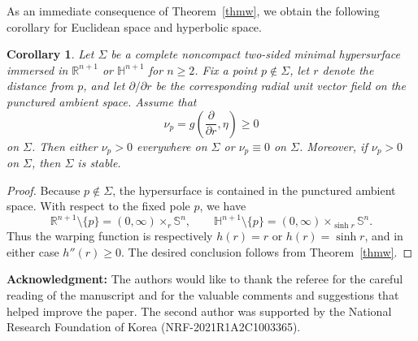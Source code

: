 \documentclass[amssymb,amstex,amsmath,11pt]{article}
\numberwithin{equation}{section}
\theoremstyle{plain}
\newtheorem{cor}[thm]{Corollary}
\theoremstyle{definition}
\theoremstyle{remark}
\begin{document}
As an immediate consequence of Theorem~\ref{thmw}, we obtain the following corollary for Euclidean space and hyperbolic space.








\begin{cor}\label{wceh}
Let $\Sigma$ be a complete noncompact two-sided minimal hypersurface immersed in $\mathbb{R}^{n+1}$ or $\mathbb{H}^{n+1}$ for $n\ge2$. Fix a point $p\notin\Sigma$, let $r$ denote the distance from $p$, and let $\partial/\partial r$ be the corresponding radial unit vector field on the punctured ambient space. Assume that
$$
\nu_p=g\!\left(\frac{\partial}{\partial r},\eta\right)\ge0
$$
on $\Sigma$. 
Then either $\nu_p>0$ everywhere on $\Sigma$ or $\nu_p\equiv0$ on $\Sigma$. 
Moreover, if $\nu_p>0$ on $\Sigma$, then $\Sigma$ is stable.
\end{cor}

\begin{proof}
Because $p\notin\Sigma$, the hypersurface is contained in the punctured ambient space. With respect to the fixed pole $p$, we have
$$
\mathbb{R}^{n+1}\setminus\{p\}=(0,\infty)\times_r\mathbb{S}^n,
\qquad
\mathbb{H}^{n+1}\setminus\{p\}=(0,\infty)\times_{\sinh r}\mathbb{S}^n.
$$
Thus the warping function is respectively $h(r)=r$ or $h(r)=\sinh r$, and in either case $h''(r)\ge0$. The desired conclusion  follows from Theorem~\ref{thmw}.
\end{proof}





















\vskip 0.3cm
\noindent
{\bf Acknowledgment: } The authors would like to thank the referee for the careful reading of the manuscript and for the valuable comments and suggestions that helped improve the paper. The second author was supported by the National Research Foundation of Korea (NRF-2021R1A2C1003365).


\end{document}
